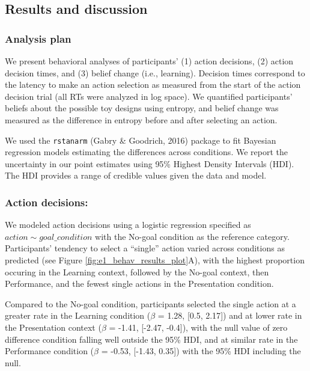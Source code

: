 \documentclass[10pt, letterpaper]{article}
\begin{document}
\subsection{Results and discussion}\label{results-and-discussion}

\subsubsection{Analysis plan}\label{analysis-plan}

We present behavioral analyses of participants' (1) action decisions,
(2) action decision times, and (3) belief change (i.e., learning).
Decision times correspond to the latency to make an action selection as
measured from the start of the action decision trial (all RTs were
analyzed in log space). We quantified participants' beliefs about the
possible toy designs using entropy, and belief change was measured as
the difference in entropy before and after selecting an action.

We used the \texttt{rstanarm} (Gabry \& Goodrich, 2016) package to fit
Bayesian regression models estimating the differences across conditions.
We report the uncertainty in our point estimates using 95\% Highest
Density Intervals (HDI). The HDI provides a range of credible values
given the data and model.

\subsubsection{Action decisions:}\label{action-decisions}

We modeled action decisions using a logistic regression specified as
\texttt{$action \sim goal\_condition$} with the No-goal condition as the
reference category. Participants' tendency to select a ``single'' action
varied across conditions as predicted (see Figure
\ref{fig:e1_behav_results_plot}A), with the highest proportion occuring
in the Learning context, followed by the No-goal context, then
Performance, and the fewest single actions in the Presentation
condition.

Compared to the No-goal condition, participants selected the single
action at a greater rate in the Learning condition (\(\beta\) = 1.28,
{[}0.5, 2.17{]}) and at lower rate in the Presentation context
(\(\beta\) = -1.41, {[}-2.47, -0.4{]}), with the null value of zero
difference condition falling well outside the 95\% HDI, and at similar
rate in the Performance condition (\(\beta\) = -0.53, {[}-1.43, 0.35{]})
with the 95\% HDI including the null.
\end{document}
